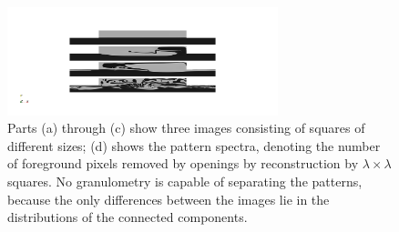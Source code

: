 \documentclass[plainboxedsections, 25pt, a1]{sciposter}
\begin{document}
\begin{multicols}{3}
 
 

\begin{figure}
\begin{center}
\includegraphics[width=0.7\textwidth]{burzawszklance.png}
\end{center}
\caption{ Parts (a) through (c) show three images consisting of squares of
different sizes;
(d) shows the pattern spectra, denoting the number of foreground pixels 
 removed by openings by reconstruction by $\lambda \times \lambda$ squares. No 
granulometry is capable of separating the patterns, because the only 
differences between the images lie in the distributions of the 
connected components. }\label{fig:blocks}
\end{figure} 

\end{multicols}


\end{document}
